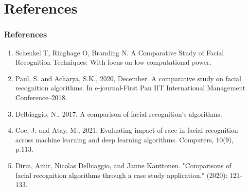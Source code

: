 \documentclass[aspectratio=169]{beamer}
\begin{document}
\section{References}
\begin{frame}
	\centering
	\frametitle{References}
	\begin{minipage}{0.95\textwidth}
		\begin{enumerate}
			\item Schenkel T, Ringhage O, Branding N. A Comparative Study of Facial Recognition Techniques: With focus on low computational power.
			\item Paul, S. and Acharya, S.K., 2020, December. A comparative study on facial recognition algorithms. In e-journal-First Pan IIT International Management Conference–2018.
			\item Delbiaggio, N., 2017. A comparison of facial recognition’s algorithms.
			\item Coe, J. and Atay, M., 2021. Evaluating impact of race in facial recognition across machine learning and deep learning algorithms. Computers, 10(9), p.113.
			\item Dirin, Amir, Nicolas Delbiaggio, and Janne Kauttonen. "Comparisons of facial recognition algorithms through a case study application." (2020): 121-133.
		\end{enumerate}
	\end{minipage}
\end{frame}
\end{document}
